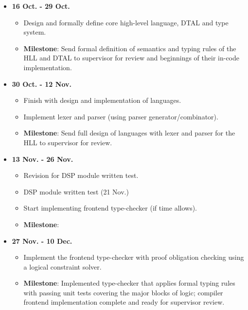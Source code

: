 \documentclass[a4paper, 12pt]{article}
\begin{document}
\begin{itemize}
  \item \textbf{16 Oct. - 29 Oct.}
    \begin{itemize}
      \item Design and formally define core high-level language, DTAL and type system.
      \item \textbf{Milestone}: Send formal definition of semantics and typing rules of the HLL and DTAL to supervisor for review and beginnings of their in-code implementation.
    \end{itemize}
  \item \textbf{30 Oct. - 12 Nov.}
    \begin{itemize}
      \item Finish with design and implementation of languages.
      \item Implement lexer and parser (using parser generator/combinator).
      \item \textbf{Milestone}: Send full design of languages with lexer and parser for the HLL to supervisor for review.
    \end{itemize}
  \item \textbf{13 Nov. - 26 Nov.}
    \begin{itemize}
      \item Revision for DSP module written test.
      \item DSP module written test (21 Nov.)
      \item Start implementing frontend type-checker (if time allows).
      \item \textbf{Milestone}:
    \end{itemize}
  \item \textbf{27 Nov. - 10 Dec.}
    \begin{itemize}
      \item Implement the frontend type-checker with proof obligation checking using a logical constraint solver.
      \item \textbf{Milestone}: Implemented type-checker that applies formal typing rules with passing unit tests covering the major blocks of logic; compiler frontend implementation complete and ready for supervisor review.
    \end{itemize}
\end{itemize}
\end{document}
